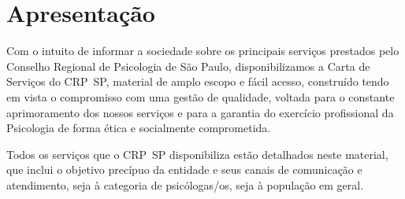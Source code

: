 \chapter{Apresentação}

Com o intuito de informar a sociedade sobre os principais serviços prestados pelo Conselho Regional de Psicologia de São Paulo, disponibilizamos a Carta de Serviços do CRP~SP, material de amplo escopo e fácil acesso, construído tendo em vista o compromisso com uma gestão de qualidade, voltada para o constante aprimoramento dos nossos serviços e para a garantia do exercício profissional da Psicologia de forma ética e socialmente comprometida.

Todos os serviços que o CRP~SP disponibiliza estão detalhados neste material, que inclui o objetivo precípuo da entidade e seus canais de comunicação e atendimento, seja à categoria de psicólogas/os, seja à população em geral.
